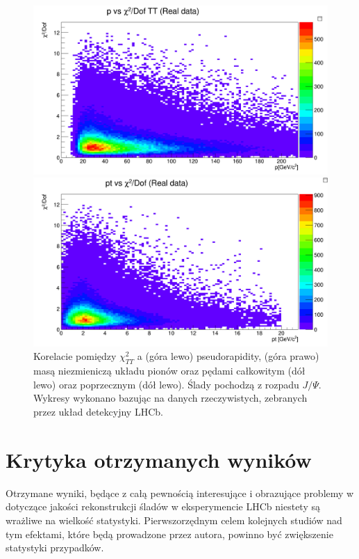 \begin{figure}[H]
\vspace*{0.5cm} %
\begin{minipage}[t]{0.5\textwidth}
\includegraphics[width=\linewidth]{rozdzial6/JPsi_p_chi2TT_data.png}
\end{minipage}
\hspace{\fill}
\begin{minipage}[t]{0.5\textwidth}
\includegraphics[width=\linewidth]{rozdzial6/JPsi_pt_chi2TT_data.png}
\end{minipage}
\caption{Korelacie pomiędzy $\chi^2_{TT}$  a (góra lewo) pseudorapidity, (góra prawo) masą niezmieniczą układu pionów oraz pędami całkowitym (dół lewo) oraz poprzecznym (dół lewo). Ślady pochodzą z rozpadu $J / \Psi$. Wykresy wykonano bazując na danych rzeczywistych, zebranych przez układ detekcyjny LHCb.} \label{corr_chi2JPsiTT_data}
\end{figure}


\section{Krytyka otrzymanych wyników}

Otrzymane wyniki, będące z całą pewnością interesujące i obrazujące problemy w dotyczące jakości rekonstrukcji śladów w eksperymencie LHCb niestety są wrażliwe na wielkość statystyki.   
Pierwszorzędnym celem kolejnych studiów nad tym efektami, które będą prowadzone przez autora, powinno być zwiększenie statystyki przypadków.  